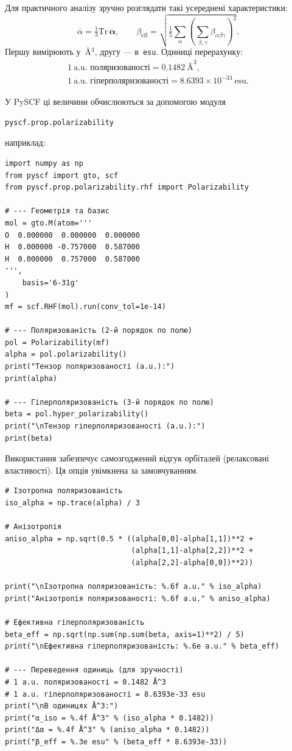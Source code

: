 \vspace{1em}
Для практичного аналізу зручно розглядати такі усереднені характеристики:
\[
\bar{\alpha} = \tfrac{1}{3}\mathrm{Tr}\,\boldsymbol{\alpha},
\qquad
\beta_\text{eff} = \sqrt{\tfrac{1}{5}\sum_\alpha
\left(\sum_{\beta,\gamma}\beta_{\alpha\beta\gamma}\right)^2 }.
\]
Першу вимірюють у~\AA$^3$, другу --- в~\texttt{esu}.
Одиниці перерахунку:
\begin{align*}
1~\text{a.u. поляризованості} = 0.1482~\text{\AA}^3, \\
1~\text{a.u. гіперполяризованості} = 8.6393\times10^{-33}~\text{esu}.
\end{align*}


У PySCF ці величини обчислюються за допомогою модуля
\begin{verbatim}
pyscf.prop.polarizability
\end{verbatim}
наприклад:
\begin{verbatim}
import numpy as np
from pyscf import gto, scf
from pyscf.prop.polarizability.rhf import Polarizability

# --- Геометрія та базис
mol = gto.M(atom='''
O  0.000000  0.000000  0.000000
H  0.000000 -0.757000  0.587000
H  0.000000  0.757000  0.587000
''',
    basis='6-31g'
)
mf = scf.RHF(mol).run(conv_tol=1e-14)

# --- Поляризованість (2-й порядок по полю)
pol = Polarizability(mf)
alpha = pol.polarizability()
print("Тензор поляризованості (a.u.):")
print(alpha)

# --- Гіперполяризованість (3-й порядок по полю)
beta = pol.hyper_polarizability()
print("\nТензор гіперполяризованості (a.u.):")
print(beta)
\end{verbatim}
\noindent
Використання  забезпечує самозгоджений відгук орбіталей (релаксовані властивості). Ця опція увімкнена за замовчуванням.

\begin{verbatim}
# Ізотропна поляризованість
iso_alpha = np.trace(alpha) / 3

# Анізотропія
aniso_alpha = np.sqrt(0.5 * ((alpha[0,0]-alpha[1,1])**2 +
                             (alpha[1,1]-alpha[2,2])**2 +
                             (alpha[2,2]-alpha[0,0])**2))

print("\nІзотропна поляризованість: %.6f a.u." % iso_alpha)
print("Анізотропія поляризованості: %.6f a.u." % aniso_alpha)

# Ефективна гіперполяризованість
beta_eff = np.sqrt(np.sum(np.sum(beta, axis=1)**2) / 5)
print("\nЕфективна гіперполяризованість: %.6e a.u." % beta_eff)

# --- Переведення одиниць (для зручності)
# 1 a.u. поляризованості = 0.1482 Å^3
# 1 a.u. гіперполяризованості = 8.6393e-33 esu
print("\nВ одиницях Å^3:")
print("α_iso = %.4f Å^3" % (iso_alpha * 0.1482))
print("Δα = %.4f Å^3" % (aniso_alpha * 0.1482))
print("β_eff = %.3e esu" % (beta_eff * 8.6393e-33))
\end{verbatim}


